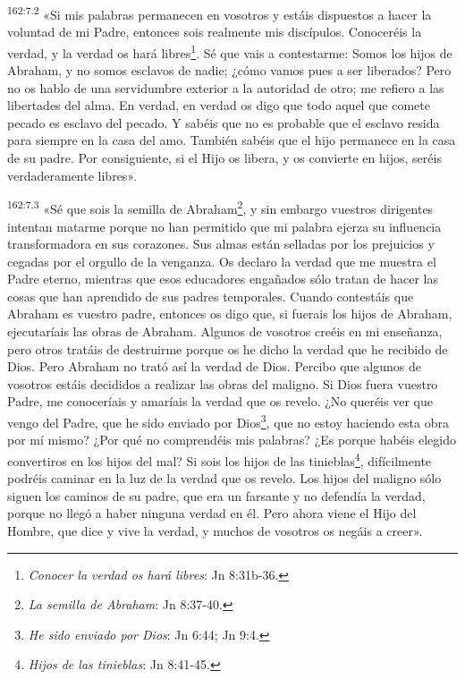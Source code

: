 \par 
\textsuperscript{162:7.2} «Si mis palabras permanecen en vosotros y estáis dispuestos a hacer la voluntad de mi Padre, entonces sois realmente mis discípulos. Conoceréis la verdad, y la verdad os hará libres\footnote{\textit{Conocer la verdad os hará libres}: Jn 8:31b-36.}. Sé que vais a contestarme: Somos los hijos de Abraham, y no somos esclavos de nadie; ¿cómo vamos pues a ser liberados? Pero no os hablo de una servidumbre exterior a la autoridad de otro; me refiero a las libertades del alma. En verdad, en verdad os digo que todo aquel que comete pecado es esclavo del pecado. Y sabéis que no es probable que el esclavo resida para siempre en la casa del amo. También sabéis que el hijo permanece en la casa de su padre. Por consiguiente, si el Hijo os libera, y os convierte en hijos, seréis verdaderamente libres».

\par 
\textsuperscript{162:7.3} «Sé que sois la semilla de Abraham\footnote{\textit{La semilla de Abraham}: Jn 8:37-40.}, y sin embargo vuestros dirigentes intentan matarme porque no han permitido que mi palabra ejerza su influencia transformadora en sus corazones. Sus almas están selladas por los prejuicios y cegadas por el orgullo de la venganza. Os declaro la verdad que me muestra el Padre eterno, mientras que esos educadores engañados sólo tratan de hacer las cosas que han aprendido de sus padres temporales. Cuando contestáis que Abraham es vuestro padre, entonces os digo que, si fuerais los hijos de Abraham, ejecutaríais las obras de Abraham. Algunos de vosotros creéis en mi enseñanza, pero otros tratáis de destruirme porque os he dicho la verdad que he recibido de Dios. Pero Abraham no trató así la verdad de Dios. Percibo que algunos de vosotros estáis decididos a realizar las obras del maligno. Si Dios fuera vuestro Padre, me conoceríais y amaríais la verdad que os revelo. ¿No queréis ver que vengo del Padre, que he sido enviado por Dios\footnote{\textit{He sido enviado por Dios}: Jn 6:44; Jn 9:4.}, que no estoy haciendo esta obra por mí mismo? ¿Por qué no comprendéis mis palabras? ¿Es porque habéis elegido convertiros en los hijos del mal? Si sois los hijos de las tinieblas\footnote{\textit{Hijos de las tinieblas}: Jn 8:41-45.}, difícilmente podréis caminar en la luz de la verdad que os revelo. Los hijos del maligno sólo siguen los caminos de su padre, que era un farsante y no defendía la verdad, porque no llegó a haber ninguna verdad en él. Pero ahora viene el Hijo del Hombre, que dice y vive la verdad, y muchos de vosotros os negáis a creer».

